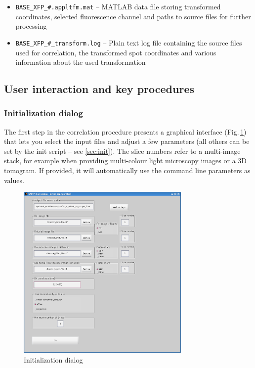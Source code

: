 \documentclass[10pt,a4paper,onepage,DIV12]{scrartcl}
\begin{document}
\begin{itemize}
\item \texttt{BASE\_XFP\_\#.appltfm.mat} -- MATLAB data file storing transformed coordinates, selected fluorescence channel and paths to source files for further processing
\item \texttt{BASE\_XFP\_\#\_transform.log} -- Plain text log file containing the source files used for correlation, the transformed spot coordinates and various information about the used transformation
\end{itemize}

\newpage
\subsection{User interaction and key procedures}
\subsubsection{Initialization dialog}
The first step in the correlation procedure presents a graphical interface (Fig.\,\ref{fig:init-gui}) that lets you select the input files and adjust a few parameters (all others can be set by the init script -- see \ref{sec:init}). The slice numbers refer to a multi-image stack, for example when providing multi-colour light microscopy images or a 3D tomogram. If provided, it will automatically use the command line parameters as values. 
\begin{figure}
 \centering
 \includegraphics[width=0.75\textwidth]{images/corr_gui}
 \caption{Initialization dialog}
 \label{fig:init-gui}
\end{figure}
\end{document}
